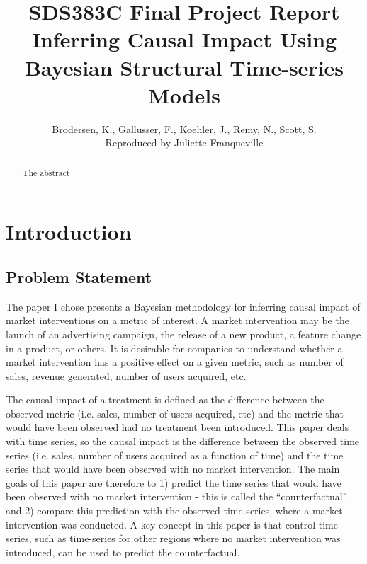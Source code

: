 \documentclass[12pt]{article}
\begin{document}
 
\title{SDS383C Final Project Report \\ \textbf{Inferring Causal Impact Using Bayesian Structural Time-series Models}} 
\author{Brodersen, K., Gallusser, F., Koehler, J., Remy, N., Scott, S.\\Reproduced by Juliette Franqueville
}
\maketitle

\begin{abstract}
    The abstract
\end{abstract}

\section{Introduction}
\subsection{Problem Statement}
The paper I chose  presents a Bayesian methodology for inferring causal impact of market interventions on a metric of interest. A market intervention may be the launch of an advertising campaign, the release of a new product, a feature change in a product, or others. It is desirable for companies to understand whether a market intervention has a positive effect on a given metric, such as number of sales, revenue generated, number of users acquired, etc. 

The causal impact of a treatment is defined as the difference between the observed metric (i.e. sales, number of users acquired, etc) and the metric that would have been observed had no treatment been introduced. This paper deals with time series, so the causal impact is the difference between the observed time series (i.e. sales, number of users acquired as a function of time) and the time series that would have been observed with no market intervention. The main goals of this paper are therefore to 1) predict the time series that would have been observed with no market intervention - this is called the ``counterfactual'' and 2) compare this prediction with the observed time series, where a market intervention was conducted.  A key concept in this paper is that control time-series, such as time-series for other regions where no market intervention was introduced, can be used to predict the counterfactual.
\end{document}
